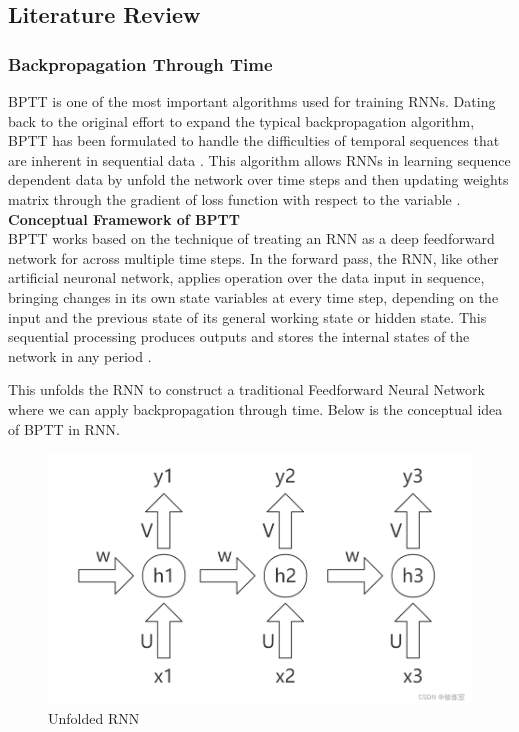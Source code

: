 \documentclass[12pt,a4paper]{article}
\begin{document}
\subsection{Literature Review}
\subsubsection{Backpropagation Through Time}
BPTT is one of the most important algorithms used for training RNNs. Dating back to the original effort to expand the typical backpropagation algorithm, BPTT has been formulated to handle the difficulties of temporal sequences that are inherent in sequential data \parencite{werbos1990bptt}. This algorithm allows RNNs in learning sequence dependent data by unfold the network over time steps and then updating weights matrix through the gradient of loss function with respect to the variable \parencite{rumelhart1986backpropagation}.
\\[2ex]
\textbf{Conceptual Framework of BPTT}
\\[1ex]
BPTT works based on the technique of treating an RNN as a deep feedforward network for across multiple time steps. In the forward pass, the RNN, like other artificial neuronal network, applies operation over the data input in sequence, bringing changes in its own state variables at every time step, depending on the input and the previous state of its general working state or hidden state. This sequential processing produces outputs and stores the internal states of the network in any period \parencite{werbos1990bptt}.

This unfolds the RNN to construct a traditional Feedforward Neural Network where we can apply backpropagation through time. Below is the conceptual idea of BPTT in RNN.
\begin{figure}[h!]
    \centering
    \includegraphics[width=1\textwidth]{../Pic/pic1.png} %
    \caption{Unfolded RNN}
\end{figure}
\end{document}
